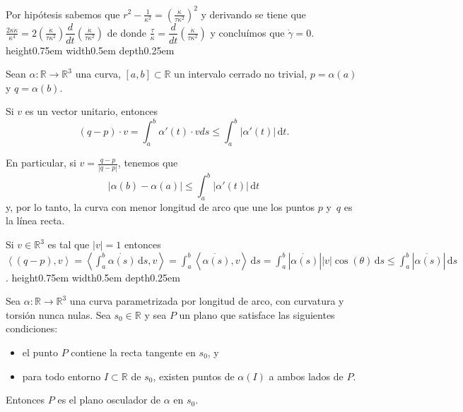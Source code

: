 \documentclass[11pt]{article}
\newcommand{\R}{{\mathbb{R}}}
\newcommand\dd{\,\mathrm{d}}
\newcommand\abs[1]{\left\lvert#1\right\rvert}
\newcommand\ip[1]{\left\langle#1\right\rangle}
\newenvironment{proof}[1][Demostraci\'on]{\begin{trivlist}
		\item[\hskip \labelsep {\bfseries #1}]}{\end{trivlist}}
\newcommand{\qed}{\nobreak \ifvmode \relax \else
	\ifdim\lastskip<1.5em \hskip-\lastskip
	\hskip1.5em plus0em minus0.5em \fi \nobreak
	\vrule height0.75em width0.5em depth0.25em\fi}
\begin{document}
\begin{enumerate}
\begin{proof}
		Por hip\'otesis sabemos que $r^2 - \frac{1}{\kappa^2} = \left( \frac{\dot{\kappa}}{\tau \kappa^2} \right)^2$ y derivando se tiene que $\frac{2 \kappa \dot{\kappa}}{\kappa^4} = 2 \left( \frac{\dot{\kappa}}{\tau \kappa^2} \right) \dfrac{d}{dt} \left( \frac{\dot{\kappa}}{\tau \kappa^2} \right)$ de donde $\frac{\tau}{\kappa} = \dfrac{d}{dt} \left( \frac{\dot{\kappa}}{\tau \kappa^2} \right)$ y conclu\'imos que $\dot{\gamma} = 0$. \qed
		
	\end{proof}
	
	\item Sean $\alpha:\R\to\R^3$ una curva, $[a,b]\subset\R$ un intervalo cerrado no trivial, $p=\alpha(a)$ y
	$q=\alpha(b)$.
	\begin{itemize}
		
		\item Si $v$ es un vector unitario, entonces
		\[
		(q-p)\cdot v = \int_a^b\alpha'(t) \cdot v ds\leq \int_a^b\abs{\alpha'(t)}\dd t.
		\]
		
		\item En particular, si $v=\frac{q-p}{\abs{q-p}}$, tenemos que
		\[
		\abs{\alpha(b)-\alpha(a)}
		\leq \int_a^b\abs{\alpha'(t)}\dd t
		\]
		y, por lo tanto, la curva con menor longitud de arco
		que une los puntos $p$ y~$q$ es la l\'inea recta.
		
		\label{Ejercicio 15}
		
		\begin{proof}
			
			Si $v \in \R^3$ es tal que $\abs{v} = 1$ entonces $ \ip{(q-p) , v} = \ip{\int_{a}^{b}{\dot{\alpha(s)}\dd s} , v } = \int_{a}^{b}{ \ip{\dot{\alpha(s)} , v} \dd s}  = \int_{a}^{b}{ \abs{\dot{\alpha(s)}} \abs{ v} \cos(\theta) \dd s}  \leq \int_{a}^{b}{ \abs{\dot{\alpha(s)}}\dd s}$. \qed
			
		\end{proof}
		
	\end{itemize}
	
	\item Sea $\alpha:\R\to\R^3$ una curva parametrizada por longitud de arco, con curvatura
	y torsi\'on nunca nulas. Sea $s_0\in\R$ y sea $P$ un plano que satisface las siguientes
	condiciones:
	\begin{itemize}
		\item[-] el punto $P$ contiene la recta tangente en $s_0$, y
		\item[-] para todo entorno $I\subset\R$ de $s_0$, existen puntos de $\alpha(I)$ a ambos lados de $P$.
	\end{itemize}
	Entonces $P$ es el plano osculador de $\alpha$ en $s_0$.
	

\end{enumerate}
\end{document}
